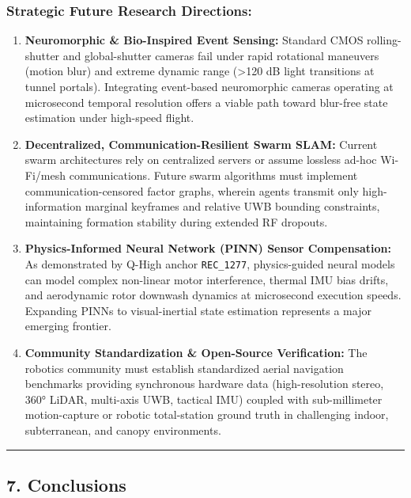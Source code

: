 \documentclass[journal]{IEEEtran}
\begin{document}
\subsubsection{Strategic Future Research
Directions:}\label{strategic-future-research-directions}

\begin{enumerate}
\def\labelenumi{\arabic{enumi}.}
\tightlist
\item
  \textbf{Neuromorphic \& Bio-Inspired Event Sensing:} Standard CMOS
  rolling-shutter and global-shutter cameras fail under rapid rotational
  maneuvers (motion blur) and extreme dynamic range (\textgreater120 dB
  light transitions at tunnel portals). Integrating event-based
  neuromorphic cameras operating at microsecond temporal resolution
  offers a viable path toward blur-free state estimation under
  high-speed flight.
\item
  \textbf{Decentralized, Communication-Resilient Swarm SLAM:} Current
  swarm architectures rely on centralized servers or assume lossless
  ad-hoc Wi-Fi/mesh communications. Future swarm algorithms must
  implement communication-censored factor graphs, wherein agents
  transmit only high-information marginal keyframes and relative UWB
  bounding constraints, maintaining formation stability during extended
  RF dropouts.
\item
  \textbf{Physics-Informed Neural Network (PINN) Sensor Compensation:}
  As demonstrated by Q-High anchor \texttt{REC\_1277}, physics-guided
  neural models can model complex non-linear motor interference, thermal
  IMU bias drifts, and aerodynamic rotor downwash dynamics at
  microsecond execution speeds. Expanding PINNs to visual-inertial state
  estimation represents a major emerging frontier.
\item
  \textbf{Community Standardization \& Open-Source Verification:} The
  robotics community must establish standardized aerial navigation
  benchmarks providing synchronous hardware data (high-resolution
  stereo, 360° LiDAR, multi-axis UWB, tactical IMU) coupled with
  sub-millimeter motion-capture or robotic total-station ground truth in
  challenging indoor, subterranean, and canopy environments.
\end{enumerate}

\begin{center}\rule{0.5\linewidth}{0.5pt}\end{center}

\subsection{7. Conclusions}\label{conclusions}
\end{document}
